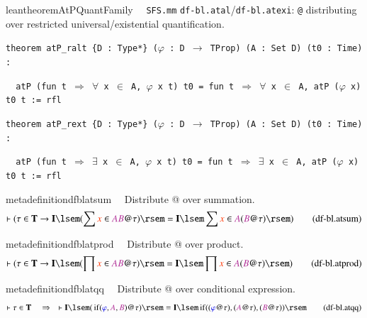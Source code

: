 \begin{restatable}{leantheorem}{AtPQuantFamily}~~ \texttt{SFS.mm} \texttt{df-bl.atal}/\texttt{df-bl.atexi}: \texttt{@} distributing over restricted universal/existential quantification.

\texttt{\textcolor{leancolor}{theorem} \textcolor{leanyellow}{atP\_ralt} \{D : Type*\} ($\varphi$ : D $\to$ TProp) (A : Set D) (t0 : Time) :}

\texttt{~~atP (\textcolor{leancolor}{fun} t $\Rightarrow$ $\forall$ x $\in$ A, $\varphi$ x t) t0 = \textcolor{leancolor}{fun} t $\Rightarrow$ $\forall$ x $\in$ A, atP ($\varphi$ x) t0 t := rfl}

\texttt{\textcolor{leancolor}{theorem} \textcolor{leanyellow}{atP\_rext} \{D : Type*\} ($\varphi$ : D $\to$ TProp) (A : Set D) (t0 : Time) :}

\texttt{~~atP (\textcolor{leancolor}{fun} t $\Rightarrow$ $\exists$ x $\in$ A, $\varphi$ x t) t0 = \textcolor{leancolor}{fun} t $\Rightarrow$ $\exists$ x $\in$ A, atP ($\varphi$ x) t0 t := rfl}
\label{atP_ralt}
\label{atP_rext}
\end{restatable}

\begin{restatable}{metadefinition}{dfblatsum}~~ Distribute @ over summation.
\begin{align}
\vdash ( \tau \in \mathbf{T} \rightarrow \mathbf{I} \lsem ( \sum \msc{x} \in
    \mc{A} \mc{B} @ \tau ) \rsem = \mathbf{I} \lsem \sum \msc{x} \in \mc{A} (
    \mc{B} @ \tau ) \rsem )\label{eq:df-bl.atsum}\tag{df-bl.atsum}
\end{align}
\end{restatable}

\begin{restatable}{metadefinition}{dfblatprod}~~ Distribute @ over product.
\begin{align}
\vdash ( \tau \in \mathbf{T} \rightarrow \mathbf{I} \lsem ( \prod \msc{x} \in
    \mc{A} \mc{B} @ \tau ) \rsem = \mathbf{I} \lsem \prod \msc{x} \in \mc{A} (
    \mc{B} @ \tau ) \rsem )\label{eq:df-bl.atprod}\tag{df-bl.atprod}
\end{align}
\end{restatable}

\begin{restatable}{metadefinition}{dfblatqq}~~ Distribute @ over conditional
expression.
\begin{align}
\vdash \tau \in \mathbf{T}\quad\Rightarrow\quad \vdash \mathbf{I} \lsem (
    \,\mathrm{if} ( \mw{\varphi} , \mc{A} , \mc{B} ) @ \tau ) \rsem =
    \mathbf{I} \lsem \,\mathrm{if} ( ( \mw{\varphi} @ \tau ) , ( \mc{A} @ \tau
    ) , ( \mc{B} @ \tau ) ) \rsem\label{eq:df-bl.atqq}\tag{df-bl.atqq}
\end{align}
\end{restatable}

